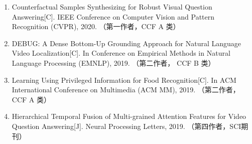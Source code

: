 \begin{publications}
\begin{enumerate}
\item{
Counterfactual Samples Synthesizing for Robust Visual Question Answering[C].
IEEE Conference on Computer Vision and Pattern Recognition (CVPR), 2020.
（第一作者，CCF A 类）
}

\item{
DEBUG: A Dense Bottom-Up Grounding Approach for Natural Language Video Localization[C].
In Conference on Empirical Methods in Natural Language Processing (EMNLP), 2019.
（第二作者， CCF B 类）
}

\item{
Learning Using Privileged Information for Food Recognition[C].
In ACM International Conference on Multimedia (ACM MM), 2019.
（第二作者，CCF A 类）
}

\item{
Hierarchical Temporal Fusion of Multi-grained Attention Features for Video Question Answering[J]. 
Neural Processing Letters, 2019. 
（第四作者，SCI期刊）
} 
\end{enumerate}


\end{publications}
